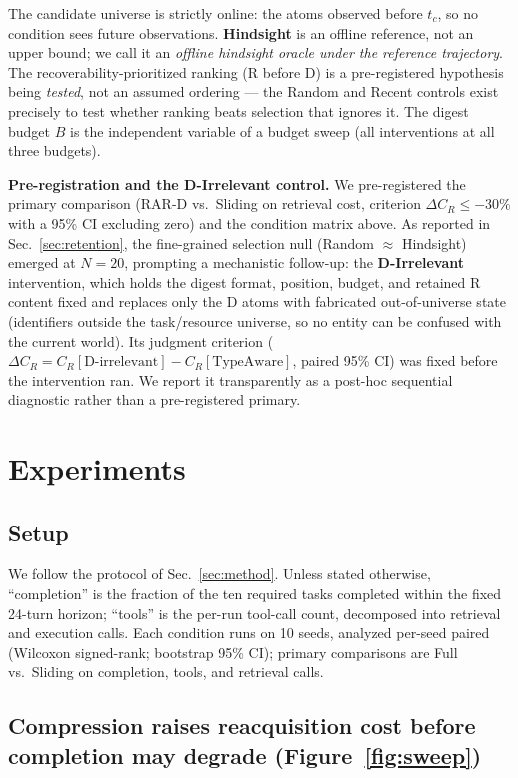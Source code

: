 \documentclass[11pt]{article}
\begin{document}
The candidate universe is strictly online: the atoms observed before $t_c$, so no
condition sees future observations. \textbf{Hindsight} is an offline reference, not an upper
bound; we call it an \emph{offline hindsight oracle under the reference trajectory}. The
recoverability-prioritized ranking (R before D) is a pre-registered hypothesis being
\emph{tested}, not an assumed ordering --- the Random and Recent controls exist precisely to
test whether ranking beats selection that ignores it. The digest budget $B$ is the
independent variable of a budget sweep (all interventions at all three budgets).

\textbf{Pre-registration and the D-Irrelevant control.} We pre-registered the primary
comparison (RAR-D vs.\ Sliding on retrieval cost, criterion $\Delta C_R \le -30\%$ with a
95\% CI excluding zero) and the condition matrix above. As reported in Sec.~\ref{sec:retention}, the
fine-grained selection null (Random $\approx$ Hindsight) emerged at $N=20$, prompting a
mechanistic follow-up: the \textbf{D-Irrelevant} intervention, which holds the digest format,
position, budget, and retained R content fixed and replaces only the D atoms with
fabricated out-of-universe state (identifiers outside the task/resource universe, so no
entity can be confused with the current world). Its judgment criterion
($\Delta C_R = C_R[\text{D-irrelevant}] - C_R[\text{TypeAware}]$, paired 95\% CI) was
fixed before the intervention ran. We report it transparently as a post-hoc sequential
diagnostic rather than a pre-registered primary.

\section{Experiments}
\label{sec:experiments}

\subsection{Setup}
\label{sec:exp-setup}

We follow the protocol of Sec.~\ref{sec:method}. Unless stated otherwise, ``completion'' is the fraction of
the ten required tasks completed within the fixed 24-turn horizon; ``tools'' is the per-run
tool-call count, decomposed into retrieval and execution calls. Each condition runs on
10 seeds, analyzed per-seed paired (Wilcoxon signed-rank; bootstrap 95\% CI); primary
comparisons are Full vs.\ Sliding on completion, tools, and retrieval calls.

\subsection{Compression raises reacquisition cost before completion may degrade (Figure~\ref{fig:sweep})}
\label{sec:sweep}
\end{document}

